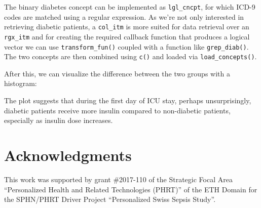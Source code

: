 \documentclass[
]{jss}
\begin{document}
The binary diabetes concept can be implemented as \texttt{lgl\_cncpt},
for which ICD-9 codes are matched using a regular expression. As we're
not only interested in retrieving diabetic patients, a \texttt{col\_itm}
is more suited for data retrieval over an \texttt{rgx\_itm} and for
creating the required callback function that produces a logical vector
we can use \texttt{transform\_fun()} coupled with a function like
\texttt{grep\_diab()}. The two concepts are then combined using
\texttt{c()} and loaded via \texttt{load\_concepts()}.

\begin{CodeChunk}
\begin{CodeInput}
R> grep_diab <- function(x) grepl("^250\\.?[0-9]{2}$", x)
R> 
R> diab  <- item("mimic", table = "diagnoses_icd",
+               callback = transform_fun(grep_diab), class = "col_itm")
R> diab  <- concept("diab", diab, "diabetes", target = "id_tbl",
+                  class = "lgl_cncpt")
R> 
R> dat <- load_concepts(c(ins24, diab), id_type = "icustay", verbose = FALSE)
R> dat <- replace_na(dat, "[0,1)", vars = "ins24")
R> dat
\end{CodeInput}
\end{CodeChunk}

After this, we can visualize the difference between the two groups with
a histogram:

The plot suggests that during the first day of ICU stay, perhaps
unsurprisingly, diabetic patients receive more insulin compared to
non-diabetic patients, especially as insulin dose increases.

\hypertarget{acknowledgments}{%
\section{Acknowledgments}\label{acknowledgments}}

This work was supported by grant \#2017-110 of the Strategic Focal Area
``Personalized Health and Related Technologies (PHRT)'' of the ETH
Domain for the SPHN/PHRT Driver Project ``Personalized Swiss Sepsis
Study''.


\end{document}
